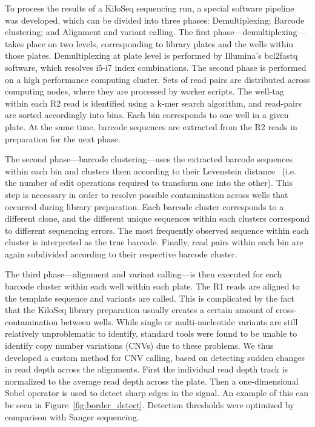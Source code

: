 To process the results of a KiloSeq sequencing run, a special software pipeline was developed, which can be divided into three phases: Demultiplexing; Barcode clustering; and Alignment and variant calling.
The first phase---demultiplexing---takes place on two levels, corresponding to library plates and the wells within those plates. Demultiplexing at plate level is performed by Illumina's bcl2fastq software, which resolves i5-i7 index combinations. The second phase is performed on a high performance computing cluster. Sets of read pairs are distributed across computing nodes, where they are processed by worker scripts. The well-tag within each R2 read is identified using a k-mer search algorithm, and read-pairs are sorted accordingly into bins. Each bin corresponds to one well in a given plate. At the same time, barcode sequences are extracted from the R2 reads in preparation for the next phase. 

The second phase---barcode clustering---uses the extracted barcode sequences within each bin and clusters them according to their Levenstein distance~\cite{levenshtein_binary_1966} (i.e. the number of edit operations required to transform one into the other). This step is necessary in order to resolve possible contamination across wells that occurred during library preparation. Each barcode cluster corresponds to a different clone, and the different unique sequences within each clusters correspond to different sequencing errors. The most frequently observed sequence within each cluster is interpreted as the true barcode. Finally, read pairs within each bin are again subdivided according to their respective barcode cluster.

The third phase---alignment and variant calling---is then executed for each barcode cluster within each well within each plate. The R1 reads are aligned to the template sequence and variants are called. This is complicated by the fact that the KiloSeq library preparation usually creates a certain amount of cross-contamination between wells. While single or multi-nucleotide variants are still relatively unproblematic to identify, standard tools were found to be unable to identify copy number variations (CNVs) due to these problems. We thus developed a custom method for CNV calling, based on detecting sudden changes in read depth across the alignments. First the individual read depth track is normalized to the average read depth across the plate. Then a one-dimensional Sobel operator is used to detect sharp edges in the signal. An example of this can be seen in Figure~\ref{fig:border_detect}. Detection thresholds were optimized by comparison with Sanger sequencing.

